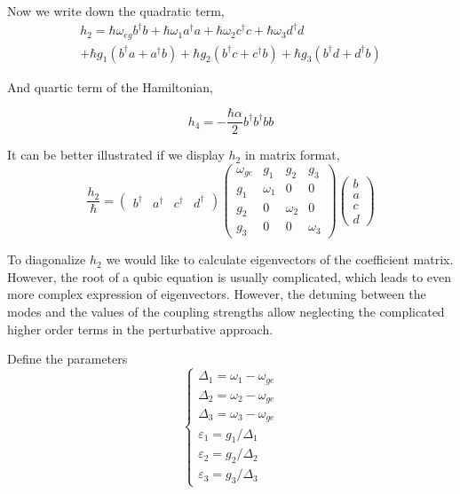 \vspace{3mm}

	Now we write down the quadratic term,
	\begin{equation} \label{eq:h2}
	\begin{split}
		h_2 = \hbar \omega_{eg}b^\dagger b + \hbar \omega_{1} a ^ \dagger a +\hbar \omega_{2} c ^\dagger c + \hbar \omega_{3} d ^\dagger d \\
		+\hbar  g_1(b^\dagger a + a ^\dagger b) + \hbar g_2(b^\dagger c + c^\dagger b) + \hbar g_3(b^\dagger d + d^\dagger b) 
    \end{split}
	\end{equation} 
	
	And quartic term of the Hamiltonian,
	
	\begin{equation}\label{eq:h4}
	h_4 =- \frac{\hbar \alpha}{2} b^\dagger b ^\dagger b b 
	\end{equation}

	It can be better illustrated if we display $h_2$ in matrix format,
	\begin{equation}
		\frac{h_2}{\hbar} = \begin{pmatrix} b^\dagger & a ^ \dagger & c^\dagger & d^\dagger \end{pmatrix}
		\begin{pmatrix}
		\omega_{ge} & g_1 & g_2 & g_3 \\
		g_1 & \omega_1 & 0 & 0 \\
		g_2 & 0 & \omega_2 & 0\\
		g_3 & 0 & 0& \omega_3
		\end{pmatrix}
		\begin{pmatrix} b \\ a \\ c  \\ d\end{pmatrix}
	\end{equation}


	To diagonalize $h_2$ we would like to calculate eigenvectors of the coefficient matrix. However, the root of a qubic equation is usually complicated, which leads to even more complex expression of eigenvectors. However, the detuning between the modes and the values of the coupling strengths allow neglecting the complicated higher order terms in the perturbative approach.

	Define the parameters
	\begin{equation}
		\begin{cases}
			\Delta_1 = \omega_1 - \omega_{ge} \\
			\Delta_2 = \omega_2 - \omega_{ge} \\
			\Delta_3 = \omega_3 - \omega_{ge} \\
			\varepsilon_1 = g_1 / \Delta_1 \\
			\varepsilon_2 = g_2 / \Delta_2 \\
			\varepsilon_3 = g_3 / \Delta_3
		\end{cases}
	\end{equation}

